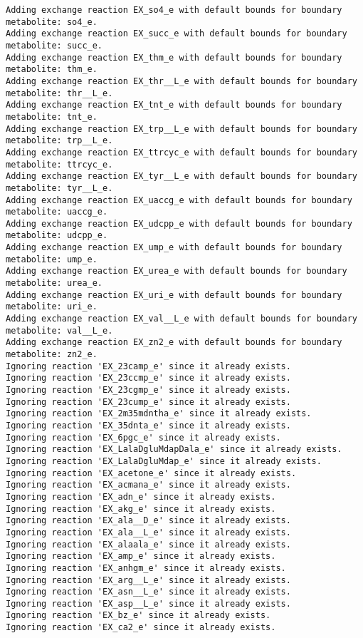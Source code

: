 \documentclass[
  letterpaper,
  DIV=11,
  numbers=noendperiod]{scrartcl}
\begin{document}
\begin{verbatim}
Adding exchange reaction EX_so4_e with default bounds for boundary metabolite: so4_e.
Adding exchange reaction EX_succ_e with default bounds for boundary metabolite: succ_e.
Adding exchange reaction EX_thm_e with default bounds for boundary metabolite: thm_e.
Adding exchange reaction EX_thr__L_e with default bounds for boundary metabolite: thr__L_e.
Adding exchange reaction EX_tnt_e with default bounds for boundary metabolite: tnt_e.
Adding exchange reaction EX_trp__L_e with default bounds for boundary metabolite: trp__L_e.
Adding exchange reaction EX_ttrcyc_e with default bounds for boundary metabolite: ttrcyc_e.
Adding exchange reaction EX_tyr__L_e with default bounds for boundary metabolite: tyr__L_e.
Adding exchange reaction EX_uaccg_e with default bounds for boundary metabolite: uaccg_e.
Adding exchange reaction EX_udcpp_e with default bounds for boundary metabolite: udcpp_e.
Adding exchange reaction EX_ump_e with default bounds for boundary metabolite: ump_e.
Adding exchange reaction EX_urea_e with default bounds for boundary metabolite: urea_e.
Adding exchange reaction EX_uri_e with default bounds for boundary metabolite: uri_e.
Adding exchange reaction EX_val__L_e with default bounds for boundary metabolite: val__L_e.
Adding exchange reaction EX_zn2_e with default bounds for boundary metabolite: zn2_e.
Ignoring reaction 'EX_23camp_e' since it already exists.
Ignoring reaction 'EX_23ccmp_e' since it already exists.
Ignoring reaction 'EX_23cgmp_e' since it already exists.
Ignoring reaction 'EX_23cump_e' since it already exists.
Ignoring reaction 'EX_2m35mdntha_e' since it already exists.
Ignoring reaction 'EX_35dnta_e' since it already exists.
Ignoring reaction 'EX_6pgc_e' since it already exists.
Ignoring reaction 'EX_LalaDgluMdapDala_e' since it already exists.
Ignoring reaction 'EX_LalaDgluMdap_e' since it already exists.
Ignoring reaction 'EX_acetone_e' since it already exists.
Ignoring reaction 'EX_acmana_e' since it already exists.
Ignoring reaction 'EX_adn_e' since it already exists.
Ignoring reaction 'EX_akg_e' since it already exists.
Ignoring reaction 'EX_ala__D_e' since it already exists.
Ignoring reaction 'EX_ala__L_e' since it already exists.
Ignoring reaction 'EX_alaala_e' since it already exists.
Ignoring reaction 'EX_amp_e' since it already exists.
Ignoring reaction 'EX_anhgm_e' since it already exists.
Ignoring reaction 'EX_arg__L_e' since it already exists.
Ignoring reaction 'EX_asn__L_e' since it already exists.
Ignoring reaction 'EX_asp__L_e' since it already exists.
Ignoring reaction 'EX_bz_e' since it already exists.
Ignoring reaction 'EX_ca2_e' since it already exists.

\end{verbatim}
\end{document}
